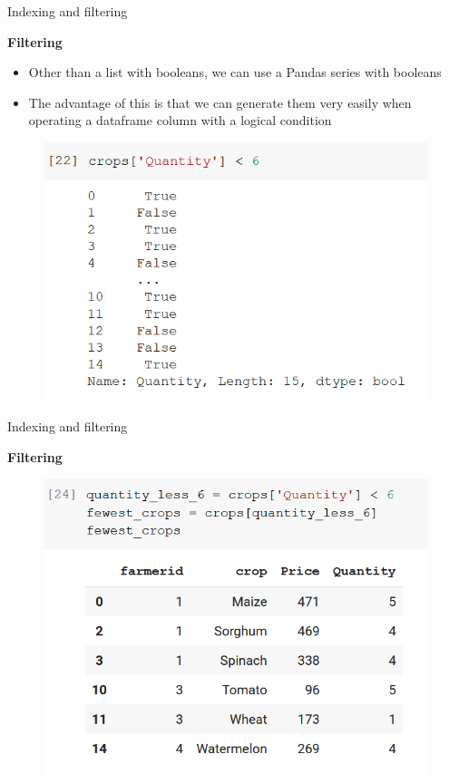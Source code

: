 \documentclass[aspectratio=169]{beamer}
\begin{document}
\begin{frame}{Indexing and filtering}

	\textbf{Filtering}

	\begin{itemize}
		\item Other than a list with booleans, we can use a Pandas series with booleans
		\item The advantage of this is that we can generate them very easily when operating a dataframe column with a logical condition
	\end{itemize}

	\begin{figure}
		\centering
		\includegraphics[width=0.45\linewidth]{img/boolean_series.png}
	\end{figure}

\end{frame}

\begin{frame}{Indexing and filtering}

	\textbf{Filtering}

	\begin{figure}
		\centering
		\includegraphics[width=0.6\linewidth]{img/fewest_crops.png}
	\end{figure}

\end{frame}
\end{document}
